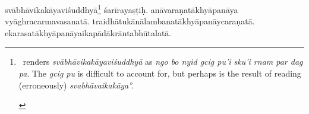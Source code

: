 \documentclass[naipra.tex]{subfiles}
\begin{document}
\begin{sanskrit}
{\begin{english}
	\end{english}
} %
svābhāvikakāyaviśuddhyā\footnote{
	\begin{english}%
		\TIB\ renders \emph{svābhāvikakāyaviśuddhyā} as \emph{ngo bo nyid gcig pu'i sku'i rnam par dag pa}. 
		The \emph{gcig pu} is difficult to account for, but perhaps is the result of reading (erroneously) \emph{svabhāvaikakāya°}.
	\end{english}
} śarīrayaṣṭiḥ.
anāvaraṇatākhyāpanāya vyāghracarmavasanatā.
traidhātukānālambanatākhyāpanāy\crux {}\crux caraṇatā.
ekarasatākhyāpanāyaikapādākrāntabhūtalatā.
\pend




\end{sanskrit}
\end{document}

